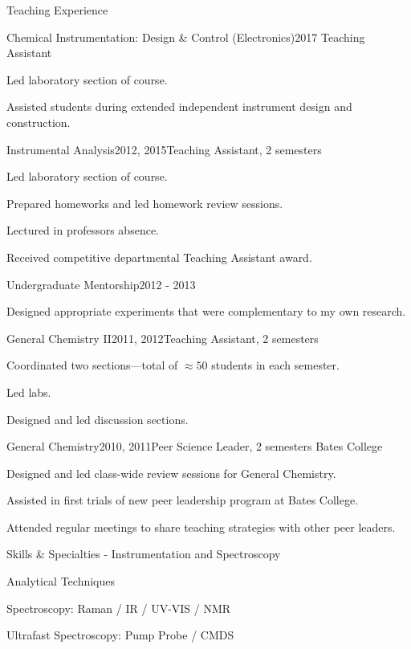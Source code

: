 \documentclass{resume}  %
\begin{document}
\begin{rSection}{Teaching Experience}
  \begin{rSubsection}{Chemical Instrumentation: Design \& Control (Electronics)}{2017}
    {Teaching Assistant}{}
    \item Led laboratory section of course.
    \item Assisted students during extended independent instrument design and construction.
  \end{rSubsection}
  \begin{rSubsection}{Instrumental Analysis}{2012, 2015}{Teaching Assistant, 2 semesters}{}
    \item Led laboratory section of course.
    \item Prepared homeworks and led homework review sessions.
    \item Lectured in professors absence.
    \item Received competitive departmental Teaching Assistant award.
  \end{rSubsection}
  \begin{rSubsection}{Undergraduate Mentorship}{2012 - 2013}{}{}
    \item Designed appropriate experiments that were complementary to my own research.
  \end{rSubsection}
  \begin{rSubsection}{General Chemistry II}{2011, 2012}{Teaching Assistant, 2 semesters}{}
    \item Coordinated two sections---total of $\approx50$ students in each semester.
    \item Led labs.
    \item Designed and led discussion sections.
  \end{rSubsection}
  \begin{rSubsection}{General Chemistry}{2010, 2011}{Peer Science Leader, 2 semesters}
    {Bates College}
    \item Designed and led class-wide review sessions for General Chemistry.
    \item Assisted in first trials of new peer leadership program at Bates College.
    \item Attended regular meetings to share teaching strategies with other peer leaders.
  \end{rSubsection}
\end{rSection}

\begin{rSection}{Skills \& Specialties - Instrumentation and Spectroscopy}
  \begin{rSubsection}{Analytical Techniques}{}{}{}
    \item Spectroscopy: Raman / IR / UV-VIS / NMR
    \item Ultrafast Spectroscopy: Pump Probe / CMDS 
  \end{rSubsection}
\end{rSection}
\end{document}
